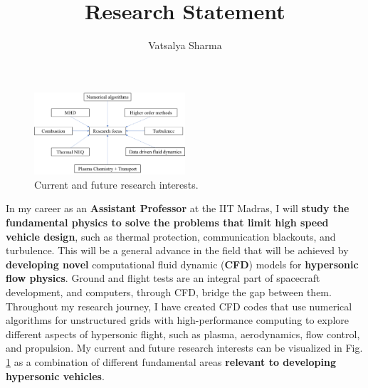 \documentclass[11pt,sans]{wlscirep} %
\title{Research Statement} %
\author[1,*]{Vatsalya Sharma}
\begin{document}
\flushbottom
\maketitle
\begin{figure}
  \begin{center}
    \includegraphics[width=0.5\textwidth]{figures/research_focus3.png}
  \end{center}
  \caption{Current and future research interests.}\vspace{-10pt}
  \label{fig:focus}
\end{figure}\vspace{0pt}
\noindent In my career as an \textbf{Assistant Professor} at the IIT Madras, I will \textbf{study the fundamental physics to solve the problems that limit high speed vehicle design}, such as thermal protection, communication blackouts, and turbulence. This will be a general advance in the field that will be achieved by \textbf{developing novel} computational fluid dynamic (\textbf{CFD}) models for \textbf{hypersonic flow physics}.   
\noindent Ground and flight tests are an integral part of spacecraft development, and computers, through CFD, bridge the gap between them. Throughout my research journey, I have created CFD codes that use numerical algorithms for unstructured grids with high-performance computing to explore different aspects of hypersonic flight, such as plasma, aerodynamics, flow control, and propulsion. My current and future research interests can be visualized in Fig. \ref{fig:focus} as a combination of different fundamental areas \textbf{relevant to developing hypersonic vehicles}.
\vspace{-10pt}
\end{document}

